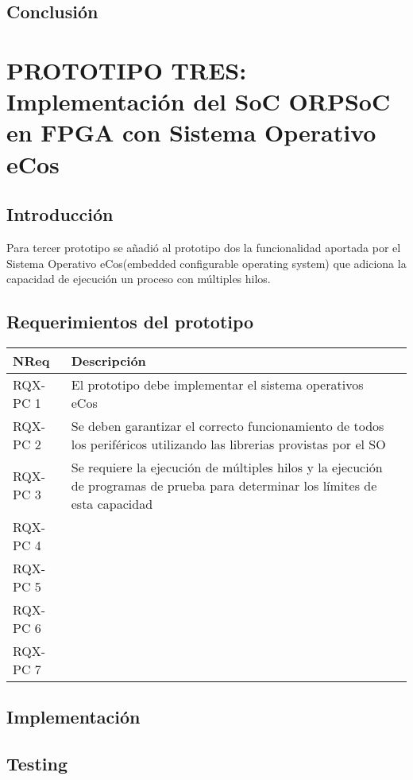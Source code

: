 		\subsection{Conclusión}


	\section{PROTOTIPO TRES: Implementación del SoC ORPSoC en FPGA con Sistema Operativo eCos}
		\subsection{Introducción}
		Para tercer prototipo se añadió al prototipo dos la funcionalidad aportada por el Sistema Operativo eCos(embedded configurable operating system) que
		adiciona la capacidad de ejecución un proceso con múltiples hilos. 

		\subsection{Requerimientos del prototipo}
		
		\begin{tabular}{ p{2.5cm} p{8cm} p{3cm} }
		\hline 
		\rowcolor[gray]{0.8} N\textordmasculine Req & Descripción\\
		\hline 
		RQX-PC 1 & El prototipo debe implementar el sistema operativos eCos\\ 
		\hline 
		RQX-PC 2 & Se deben garantizar el correcto funcionamiento de todos los periféricos utilizando las librerias provistas por el SO\\ 
		\hline 
		RQX-PC 3 & Se requiere la ejecución de múltiples hilos y la ejecución de programas de prueba para determinar los límites de esta capacidad \\ 
		\hline
		RQX-PC 4 & \\
		\hline
		RQX-PC 5 & \\
		\hline
		RQX-PC 6 & \\
		\hline
		RQX-PC 7 & \\
		\hline		
		\end{tabular}
		
		
		\subsection{Implementación}
		
		\subsection{Testing}
		
